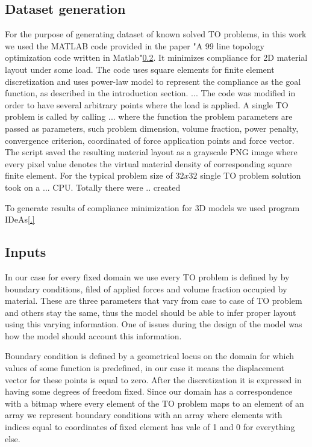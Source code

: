 \subsection{Dataset generation}

For the purpose of generating dataset of known solved TO problems, in this work we used the MATLAB code provided in the paper "A 99 line topology optimization code written in Matlab"\ref{}.
It minimizes compliance for 2D material layout under some load.
The code uses square elements for finite element discretization and uses power-law model to represent the compliance as the goal function, as described in the introduction section.
...
The code was modified in order to have several arbitrary points where the load is applied.
A single TO problem is called by calling ... where the function the problem parameters are passed as parameters, such problem dimension, volume fraction, power penalty, convergence criterion, coordinated of force application points and force vector. 
The script saved the resulting material layout as a grayscale PNG image where every pixel value denotes the virtual material density of corresponding square finite element.
For the typical problem size of $ 32 x 32 $ single TO problem solution took on a ... CPU.
Totally there were .. created

To generate results of compliance minimization for 3D models we used program IDeAs\ref{.} 




\subsection{Inputs}

In our case for every fixed domain we use every TO problem is defined by by boundary conditions, filed of applied forces and volume fraction occupied by material. 
These are three parameters that vary from case to case of TO problem and others stay the same, thus the model should be able to infer proper layout using this varying information.
One of issues during the design of the model was how the model should account this information.

Boundary condition is defined by a geometrical locus on the domain for which values of some function is predefined, in our case it means the displacement vector for these points is equal to zero. 
After the discretization it is expressed in having some degrees of freedom fixed. 
Since our domain has a correspondence with a bitmap where every element of the TO problem maps to an element of an array we represent boundary conditions with an array where elements with indices equal to coordinates of fixed element has vale of {1} and {0} for everything else.

